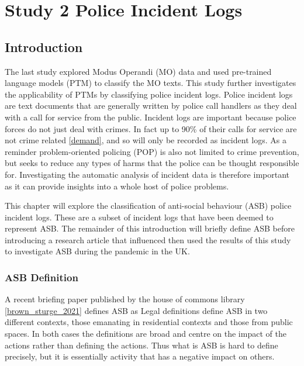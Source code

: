 
\chapter{Study 2  Police Incident Logs}


\section{Introduction}

The last study explored Modus Operandi (MO) data and used pre-trained language models (PTM) to classify the MO texts. This study further investigates the applicability of PTMs by classifying police incident logs.  Police incident logs are text documents that are generally written by police call handlers as they deal with a call for service from the public. Incident logs are important because police forces do not just deal with crimes. In fact up to 90\% of their calls for service are not crime related \ref{demand}, and so will only be recorded as incident logs. As a reminder problem-oriented policing (POP) is also not limited to crime prevention, but seeks to reduce any types of harms that the police can be thought responsible for. Investigating the automatic analysis of incident data is therefore important as it can provide insights into a whole host of police problems. 

This chapter will explore the classification of anti-social behaviour (ASB) police incident logs. These are a subset of incident logs that have been deemed to represent ASB. The remainder of this introduction will briefly define ASB before introducing a research article that influenced then used the results of this study to investigate ASB during the pandemic in the UK.  


\subsection{ASB Definition}
 A recent briefing paper published by the house of commons library \ref{brown_sturge_2021} defines ASB as   Legal definitions define ASB in two different contexts, those emanating in residential contexts and those from public spaces. In both cases the definitions are broad and centre on the impact of the actions rather than defining the actions. Thus what is ASB is hard to define precisely, but it is essentially activity that has a negative impact on others.    
 
